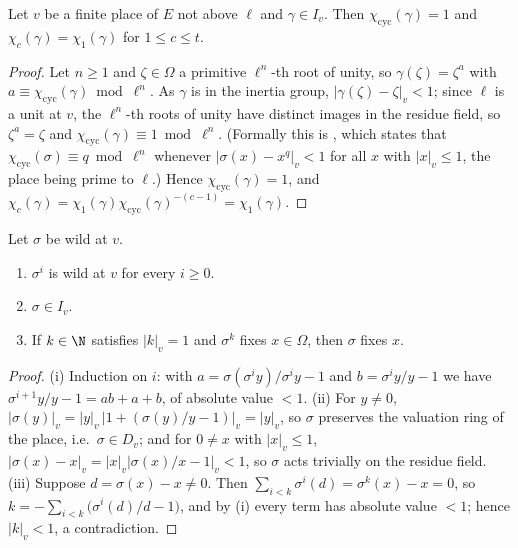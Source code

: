 \begin{lemma}\label{pf:linkN:cycunr}
Let $v$ be a finite place of $E$ not above $\ell$ and $\gamma\in I_v$. Then $\chi_{\mathrm{cyc}}(\gamma)=1$ and $\chi_c(\gamma)=\chi_1(\gamma)$ for
$1\le c\le t$.
\end{lemma}

\begin{proof}
Let $n\ge1$ and $\zeta\in\Omega$ a primitive $\ell^n$-th root of unity, so $\gamma(\zeta)=\zeta^a$ with $a\equiv\chi_{\mathrm{cyc}}(\gamma)\bmod\ell^n$.
As $\gamma$ is in the inertia group, $|\gamma(\zeta)-\zeta|_v<1$; since $\ell$ is a unit at $v$, the $\ell^n$-th roots of unity have distinct
images in the residue field, so $\zeta^a=\zeta$ and $\chi_{\mathrm{cyc}}(\gamma)\equiv1\bmod\ell^n$. (Formally this is
, which states that $\chi_{\mathrm{cyc}}(\sigma)\equiv q\bmod\ell^n$ whenever
$|\sigma(x)-x^q|_v<1$ for all $x$ with $|x|_v\le1$, the place being prime to $\ell$.) Hence $\chi_{\mathrm{cyc}}(\gamma)=1$, and
$\chi_c(\gamma)=\chi_1(\gamma)\chi_{\mathrm{cyc}}(\gamma)^{-(c-1)}=\chi_1(\gamma)$.
\end{proof}

\begin{lemma}\label{pf:linkN:wildel}
Let $\sigma$ be wild at $v$.
\begin{enumerate}[label=(\roman*)]
\item $\sigma^i$ is wild at $v$ for every $i\ge0$.
\item $\sigma\in I_v$.
\item If $k\in\N$ satisfies $|k|_v=1$ and $\sigma^k$ fixes $x\in\Omega$, then $\sigma$ fixes $x$.
\end{enumerate}
\end{lemma}

\begin{proof}
(i) Induction on $i$: with $a=\sigma(\sigma^iy)/\sigma^iy-1$ and $b=\sigma^iy/y-1$ we have $\sigma^{i+1}y/y-1=ab+a+b$, of absolute value $<1$.
(ii) For $y\ne0$, $|\sigma(y)|_v=|y|_v\,|1+(\sigma(y)/y-1)|_v=|y|_v$, so $\sigma$ preserves the valuation ring of the place, i.e.\
$\sigma\in D_v$; and for $0\ne x$ with $|x|_v\le1$, $|\sigma(x)-x|_v=|x|_v|\sigma(x)/x-1|_v<1$, so $\sigma$ acts trivially on the residue
field. (iii) Suppose $d=\sigma(x)-x\ne0$. Then $\sum_{i<k}\sigma^i(d)=\sigma^k(x)-x=0$, so $k=-\sum_{i<k}\bigl(\sigma^i(d)/d-1\bigr)$, and by (i)
every term has absolute value $<1$; hence $|k|_v<1$, a contradiction.
\end{proof}


